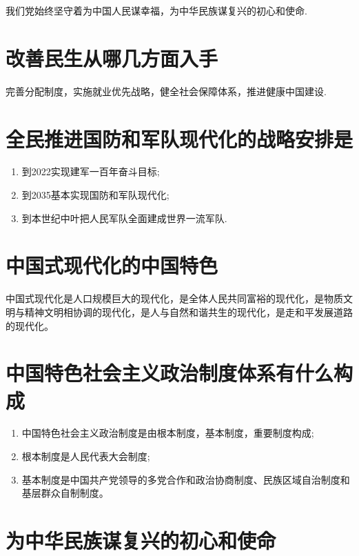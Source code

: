 \documentclass[12pt, a4paper, oneside]{ctexbook}
\begin{document}
我们党始终坚守着为中国人民谋幸福，为中华民族谋复兴的初心和使命.

\section{改善民生从哪几方面入手}

完善分配制度，实施就业优先战略，健全社会保障体系，推进健康中国建设.

\section{全民推进国防和军队现代化的战略安排是}

\begin{enumerate}
\item 到2022实现建军一百年奋斗目标;

\item 到2035基本实现国防和军队现代化;

\item 到本世纪中叶把人民军队全面建成世界一流军队.
\end{enumerate}

\section{中国式现代化的中国特色}

中国式现代化是人口规模巨大的现代化，是全体人民共同富裕的现代化，是物质文明与精神文明相协调的现代化，是人与自然和谐共生的现代化，是走和平发展道路的现代化。

\section{中国特色社会主义政治制度体系有什么构成}
\begin{enumerate}
\item 中国特色社会主义政治制度是由根本制度，基本制度，重要制度构成;

\item 根本制度是人民代表大会制度;

\item 基本制度是中国共产党领导的多党合作和政治协商制度、民族区域自治制度和基层群众自制制度。
\end{enumerate}

\section{为中华民族谋复兴的初心和使命}
\end{document}

